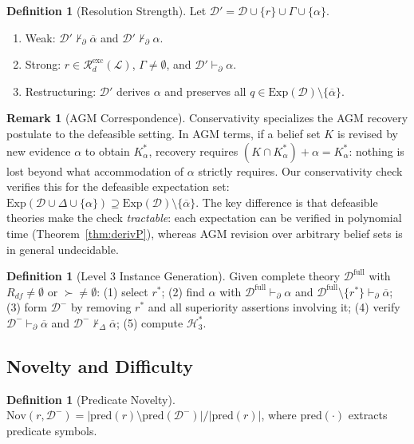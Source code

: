 \documentclass{article}
\theoremstyle{definition}
\newtheorem{definition}[theorem]{Definition}
\newtheorem{remark}[theorem]{Remark}
\newcommand{\D}{\mathcal{D}}
\newcommand{\Dm}{\mathcal{D}^{-}}
\newcommand{\Dfull}{\mathcal{D}^{\mathrm{full}}}
\newcommand{\Rgold}{\mathcal{H}^{*}_3}
\newcommand{\La}{\mathcal{L}}
\newcommand{\Rdf}{R_{df}}
\newcommand{\Rdexcspace}{\mathcal{R}_{d}^{\mathrm{exc}}}
\newcommand{\pred}{\mathrm{pred}}
\newcommand{\Exp}{\mathrm{Exp}}
\newcommand{\Nov}{\mathrm{Nov}}
\newcommand{\pDelta}{\vdash_{\Delta}}
\newcommand{\pPartial}{\vdash_{\partial}}
\newcommand{\comp}[1]{\overline{#1}}
\begin{document}
\begin{definition}[Resolution Strength]\label{def:resstrength}
Let $\D' = \D \cup \{r\} \cup \Gamma \cup \{\alpha\}$.
\begin{enumerate}[label=(\roman*),nosep]
    \item Weak: $\D' \not\pPartial \comp{\alpha}$ and $\D' \not\pPartial \alpha$.
    \item Strong: $r \in \Rdexcspace(\La)$, $\Gamma \neq \emptyset$, and $\D' \pPartial \alpha$.
    \item Restructuring: $\D'$ derives $\alpha$ and preserves all $q \in \Exp(\D) \setminus \{\comp{\alpha}\}$.
\end{enumerate}
\end{definition}

\begin{remark}[AGM Correspondence]\label{rem:agm}
Conservativity specializes the AGM recovery postulate \cite{alchourron1985logic} to the defeasible setting. In AGM terms, if a belief set $K$ is revised by new evidence $\alpha$ to obtain $K^*_\alpha$, recovery requires $(K \cap K^*_\alpha) + \alpha = K^*_\alpha$: nothing is lost beyond what accommodation of $\alpha$ strictly requires. Our conservativity check verifies this for the defeasible expectation set: $\Exp(\D \cup \Delta \cup \{\alpha\}) \supseteq \Exp(\D) \setminus \{\comp{\alpha}\}$. The key difference is that defeasible theories make the check \emph{tractable}: each expectation can be verified in polynomial time (Theorem~\ref{thm:derivP}), whereas AGM revision over arbitrary belief sets is in general undecidable.
\end{remark}

\begin{definition}[Level 3 Instance Generation]\label{def:level3gen}
Given complete theory $\Dfull$ with $\Rdf \neq \emptyset$ or ${\succ} \neq \emptyset$: (1) select $r^*$; (2) find $\alpha$ with $\Dfull \pPartial \alpha$ and $\Dfull \setminus \{r^*\} \pPartial \comp{\alpha}$; (3) form $\Dm$ by removing $r^*$ and all superiority assertions involving it; (4) verify $\Dm \pPartial \comp{\alpha}$ and $\Dm \not\pDelta \comp{\alpha}$; (5) compute $\Rgold$.
\end{definition}


\subsection{Novelty and Difficulty}

\begin{definition}[Predicate Novelty]\label{def:novelty}
$\Nov(r, \Dm) = |\pred(r) \setminus \pred(\Dm)| / |\pred(r)|$, where $\pred(\cdot)$ extracts predicate symbols.
\end{definition}
\end{document}
